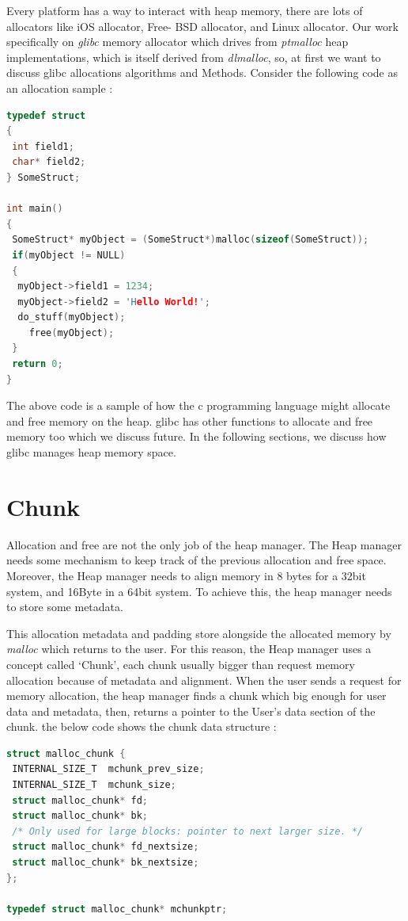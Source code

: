 \documentclass{masterthesis}
\newcommand*\libc{glibc}
\begin{document}
Every platform has a way to interact with heap memory, there are lots of allocators like iOS allocator, Free- BSD allocator, and Linux allocator. Our work specifically on \emph{ \libc{}} memory allocator which drives from \emph{ptmalloc} heap implementations, which is itself derived from \emph{dlmalloc}, so, at first we want to discuss \libc{} allocations algorithms and Methods. Consider the following code as an allocation sample : 

\begin{lstlisting}[language=c,frame=tlrb]
typedef struct 
{
 int field1;
 char* field2;
} SomeStruct;
 
int main()
{
 SomeStruct* myObject = (SomeStruct*)malloc(sizeof(SomeStruct));
 if(myObject != NULL)
 {
  myObject->field1 = 1234;
  myObject->field2 = 'Hello World!';
  do_stuff(myObject);
	free(myObject);
 }
 return 0;
}

\end{lstlisting}

The above code is a sample of how the c programming language might allocate and free memory on the heap. \libc{} has other functions to allocate and free memory too which we discuss future. In the following sections, we discuss how \libc{} manages heap memory space. 

\section{Chunk}

Allocation and free are not the only job of the heap manager. The Heap manager needs some mechanism to keep track of the previous allocation and free space. Moreover, the Heap manager needs to align memory in 8 bytes for a 32bit system, and 16Byte in a 64bit system. To achieve this, the heap manager needs to store some metadata.

This allocation metadata and padding store alongside the allocated memory by \emph{malloc} which returns to the user. For this reason, the Heap manager uses a concept called ‘Chunk’, each chunk usually bigger than request memory allocation because of metadata and alignment. When the user sends a request for memory allocation, the heap manager finds a chunk which big enough for user data and metadata, then, returns a pointer to the User's data section of the chunk. the below code shows the chunk data structure :

\begin{lstlisting}[language=c,frame=tlrb]
struct malloc_chunk {
 INTERNAL_SIZE_T  mchunk_prev_size; 
 INTERNAL_SIZE_T  mchunk_size;
 struct malloc_chunk* fd; 
 struct malloc_chunk* bk;
 /* Only used for large blocks: pointer to next larger size. */
 struct malloc_chunk* fd_nextsize;
 struct malloc_chunk* bk_nextsize;
};

typedef struct malloc_chunk* mchunkptr;
\end{lstlisting}
\end{document}
